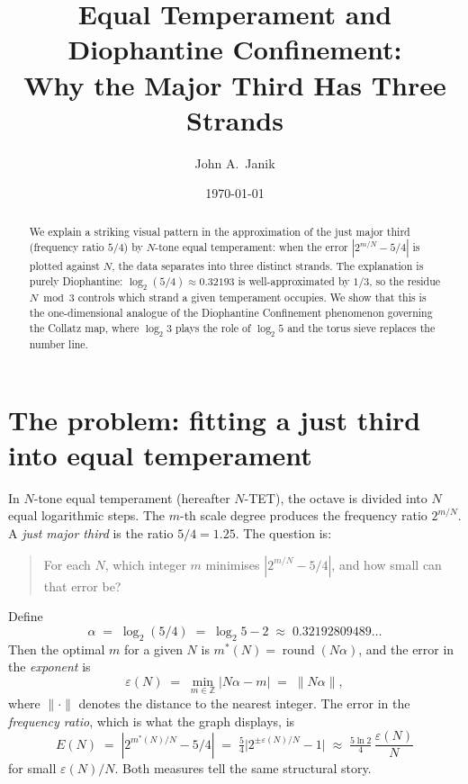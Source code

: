 \documentclass[12pt]{article}
\title{Equal Temperament and Diophantine Confinement:\\
  Why the Major Third Has Three Strands}
\author{John A.\ Janik}
\date{\today}
\newcommand{\Z}{\mathbb{Z}}
\theoremstyle{plain}
\theoremstyle{definition}
\theoremstyle{remark}
\numberwithin{equation}{section}
\begin{document}
\maketitle

\begin{abstract}
We explain a striking visual pattern in the approximation of the
just major third (frequency ratio $5/4$) by $N$-tone equal temperament:
when the error $|2^{m/N} - 5/4|$ is plotted against $N$, the data
separates into three distinct strands.  The explanation is purely
Diophantine: $\log_2(5/4) \approx 0.32193$ is well-approximated by
$1/3$, so the residue $N \bmod 3$ controls which strand a given
temperament occupies.  We show that this is the one-dimensional
analogue of the Diophantine Confinement phenomenon governing the
Collatz map, where $\log_2 3$ plays the role of $\log_2 5$ and the
torus sieve replaces the number line.
\end{abstract}

\section{The problem: fitting a just third into equal temperament}
\label{sec:problem}

In $N$-tone equal temperament (hereafter $N$-TET), the octave is
divided into $N$ equal logarithmic steps.  The $m$-th scale degree
produces the frequency ratio $2^{m/N}$.  A \emph{just major third}
is the ratio $5/4 = 1.25$.  The question is:

\begin{quote}
For each $N$, which integer $m$ minimises
$|2^{m/N} - 5/4|$, and how small can that error be?
\end{quote}

\noindent
Define
\begin{equation}\label{eq:alpha}
  \alpha \;=\; \log_2(5/4) \;=\; \log_2 5 - 2
  \;\approx\; 0.32192809489\ldots
\end{equation}
Then the optimal $m$ for a given $N$ is $m^*(N) = \operatorname{round}(N\alpha)$,
and the error in the \emph{exponent} is
\begin{equation}\label{eq:eps}
  \varepsilon(N) \;=\; \min_{m \in \Z} |N\alpha - m|
  \;=\; \|N\alpha\|,
\end{equation}
where $\|\cdot\|$ denotes the distance to the nearest integer.  The
error in the \emph{frequency ratio}, which is what the graph displays, is
\begin{equation}\label{eq:freq-error}
  E(N) \;=\; |2^{m^*(N)/N} - 5/4|
  \;=\; \tfrac{5}{4}\bigl|2^{\pm\varepsilon(N)/N} - 1\bigr|
  \;\approx\; \tfrac{5\ln 2}{4}\,\frac{\varepsilon(N)}{N}
\end{equation}
for small $\varepsilon(N)/N$.  Both measures tell the same structural
story.
\end{document}
